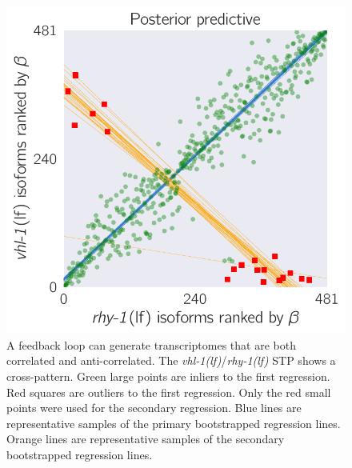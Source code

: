 \documentclass[10pt, onecolumn]{article}
\newcommand{\rhy}{\emph{\mbox{rhy-1}(lf)}}
\newcommand{\vhl}{\emph{\mbox{vhl-1}(lf)}}
\begin{document}
\begin{figure}[tbhp]
\centering
\includegraphics[width=.4\linewidth]{../figs/multiplemodes-ed.pdf}
\caption{
A feedback loop can generate transcriptomes that are both
correlated and anti-correlated. The \vhl{}/\rhy{} STP shows a cross-pattern.
Green large points are inliers to the first
regression. Red squares are outliers to the first regression. Only the red
small points were used for the secondary regression. Blue lines are representative
samples of the primary bootstrapped regression lines. Orange lines are
representative samples of the secondary bootstrapped regression lines.
}
\label{fig:xpattern}
\end{figure}
\end{document}
